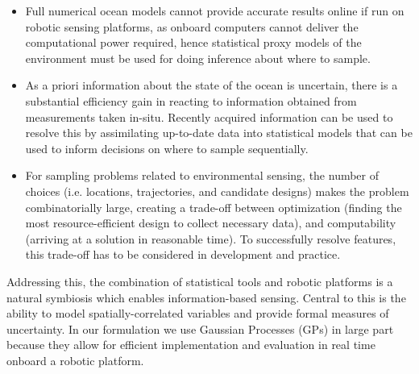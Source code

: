 \documentclass[aoas]{imsart}
\begin{document}
\begin{itemize}

\item Full numerical ocean models cannot provide accurate results
  online if run on robotic sensing platforms, as onboard computers
  cannot deliver the computational power required, hence statistical
  proxy models of the environment must be used for doing inference
  about where to sample.

\item As a priori information about the state of the ocean is
  uncertain, there is a substantial efficiency gain in reacting to
  information obtained from measurements taken in-situ. Recently
  acquired information can be used to resolve this by assimilating up-to-date data into statistical models that
  can be used to inform decisions on where to sample
  sequentially.%

\item For sampling problems related to environmental sensing, the
  number of choices (i.e. locations, trajectories, and candidate
  designs) makes the problem combinatorially large, creating a
  trade-off between optimization (finding the most resource-efficient
  design to collect necessary data), and computability (arriving at a
  solution in reasonable time). To successfully resolve features, this
  trade-off has to be considered in development and practice.

\end{itemize}

Addressing this, the combination of statistical tools and robotic platforms is a
natural symbiosis which enables information-based sensing. Central to
this is the ability to model spatially-correlated variables and
provide formal measures of uncertainty. In our formulation we use
Gaussian Processes (GPs) in large part because they allow for
efficient implementation and evaluation in real time onboard a robotic platform.


\end{document}
